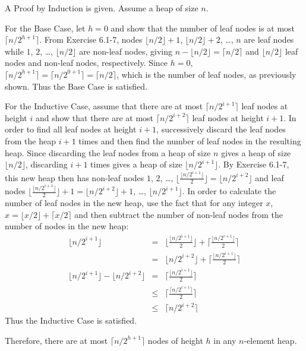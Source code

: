 A Proof by Induction is given. Assume a heap of size $n$.

For the Base Case, let $h = 0$ and show that the number of leaf nodes is at most $\lceil n / 2^{h+1} \rceil$. From Exercise 6.1-7, nodes $\lfloor n / 2 \rfloor + 1$, $\lfloor n / 2 \rfloor + 2$, \ldots, $n$ are leaf nodes while $1$, $2$, \ldots, $\lfloor n / 2 \rfloor$ are non-leaf nodes, giving $n - \lfloor n / 2 \rfloor = \lceil n / 2 \rceil$ and $\lfloor n / 2 \rfloor$ leaf nodes and non-leaf nodes, respectively. Since $h = 0$, $\lceil n / 2^{h+1} \rceil = \lceil n / 2^{0+1} \rceil = \lceil n / 2 \rceil$, which is the number of leaf nodes, as previously shown. Thus the Base Case is satisfied.

For the Inductive Case, assume that there are at most $\lceil n / 2^{i+1} \rceil$ leaf nodes at height $i$ and show that there are at most $\lceil n / 2^{i+2} \rceil$ leaf nodes at height $i + 1$. In order to find all leaf nodes at height $i + 1$, successively discard the leaf nodes from the heap $i+1$ times and then find the number of leaf nodes in the resulting heap. Since discarding the leaf nodes from a heap of size $n$ gives a heap of size $\lfloor n / 2 \rfloor$, discarding $i + 1$ times gives a heap of size $\lfloor n / 2^{i+1} \rfloor$. By Exercise 6.1-7, this new heap then has non-leaf nodes $1$, $2$, \ldots, $\lfloor \frac{\lfloor n / 2^{i+1} \rfloor}{2} \rfloor = \lfloor n / 2^{i+2} \rfloor$ and leaf nodes $\lfloor \frac{\lfloor n / 2^{i+1} \rfloor}{2} \rfloor + 1 = \lfloor n / 2^{i+2} \rfloor + 1$, \ldots, $\lfloor n / 2^{i+1} \rfloor$. In order to calculate the number of leaf nodes in the new heap, use the fact that for any integer $x$, $x = \lfloor x / 2 \rfloor + \lceil x / 2 \rceil$ and then subtract the number of non-leaf nodes from the number of nodes in the new heap:
\begin{eqnarray*}
	\lfloor n / 2^{i+1} \rfloor & = & \lfloor \frac{\lfloor n / 2^{i+1} \rfloor}{2} \rfloor + \lceil \frac{\lfloor n / 2^{i+1} \rfloor}{2} \rceil \\
	& = & \lfloor n / 2^{i+2} \rfloor + \lceil \frac{ \lfloor n / 2^{i+1} \rfloor}{2} \rceil \\
	\lfloor n / 2^{i+1} \rfloor - \lfloor n / 2^{i+2} \rfloor & = & \lceil \frac{\lfloor n / 2^{i+1} \rfloor}{2} \rceil \\
	& \leq & \lceil \frac{\lceil n / 2^{i+1} \rceil}{2} \rceil \\
	& \leq & \lceil n / 2^{i+2} \rceil
\end{eqnarray*}
Thus the Inductive Case is satisfied.

Therefore, there are at most $\lceil n / 2^{h+1} \rceil$ nodes of height $h$ in any $n$-element heap.
